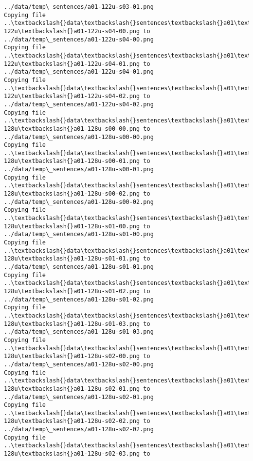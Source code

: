 \documentclass[11pt]{article}
\begin{document}
\begin{Verbatim}[commandchars=\\\{\}]
../data/temp\_sentences/a01-122u-s03-01.png
Copying file ..\textbackslash{}data\textbackslash{}sentences\textbackslash{}a01\textbackslash{}a01-122u\textbackslash{}a01-122u-s04-00.png to
../data/temp\_sentences/a01-122u-s04-00.png
Copying file ..\textbackslash{}data\textbackslash{}sentences\textbackslash{}a01\textbackslash{}a01-122u\textbackslash{}a01-122u-s04-01.png to
../data/temp\_sentences/a01-122u-s04-01.png
Copying file ..\textbackslash{}data\textbackslash{}sentences\textbackslash{}a01\textbackslash{}a01-122u\textbackslash{}a01-122u-s04-02.png to
../data/temp\_sentences/a01-122u-s04-02.png
Copying file ..\textbackslash{}data\textbackslash{}sentences\textbackslash{}a01\textbackslash{}a01-128u\textbackslash{}a01-128u-s00-00.png to
../data/temp\_sentences/a01-128u-s00-00.png
Copying file ..\textbackslash{}data\textbackslash{}sentences\textbackslash{}a01\textbackslash{}a01-128u\textbackslash{}a01-128u-s00-01.png to
../data/temp\_sentences/a01-128u-s00-01.png
Copying file ..\textbackslash{}data\textbackslash{}sentences\textbackslash{}a01\textbackslash{}a01-128u\textbackslash{}a01-128u-s00-02.png to
../data/temp\_sentences/a01-128u-s00-02.png
Copying file ..\textbackslash{}data\textbackslash{}sentences\textbackslash{}a01\textbackslash{}a01-128u\textbackslash{}a01-128u-s01-00.png to
../data/temp\_sentences/a01-128u-s01-00.png
Copying file ..\textbackslash{}data\textbackslash{}sentences\textbackslash{}a01\textbackslash{}a01-128u\textbackslash{}a01-128u-s01-01.png to
../data/temp\_sentences/a01-128u-s01-01.png
Copying file ..\textbackslash{}data\textbackslash{}sentences\textbackslash{}a01\textbackslash{}a01-128u\textbackslash{}a01-128u-s01-02.png to
../data/temp\_sentences/a01-128u-s01-02.png
Copying file ..\textbackslash{}data\textbackslash{}sentences\textbackslash{}a01\textbackslash{}a01-128u\textbackslash{}a01-128u-s01-03.png to
../data/temp\_sentences/a01-128u-s01-03.png
Copying file ..\textbackslash{}data\textbackslash{}sentences\textbackslash{}a01\textbackslash{}a01-128u\textbackslash{}a01-128u-s02-00.png to
../data/temp\_sentences/a01-128u-s02-00.png
Copying file ..\textbackslash{}data\textbackslash{}sentences\textbackslash{}a01\textbackslash{}a01-128u\textbackslash{}a01-128u-s02-01.png to
../data/temp\_sentences/a01-128u-s02-01.png
Copying file ..\textbackslash{}data\textbackslash{}sentences\textbackslash{}a01\textbackslash{}a01-128u\textbackslash{}a01-128u-s02-02.png to
../data/temp\_sentences/a01-128u-s02-02.png
Copying file ..\textbackslash{}data\textbackslash{}sentences\textbackslash{}a01\textbackslash{}a01-128u\textbackslash{}a01-128u-s02-03.png to

\end{Verbatim}
\end{document}
